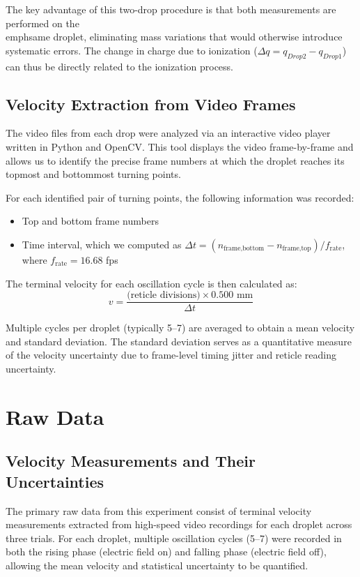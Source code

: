 \documentclass[11pt]{article}
\begin{document}
The key advantage of this two-drop procedure is that both measurements are performed on the \\emph{same droplet}, eliminating mass variations that would otherwise introduce systematic errors. The change in charge due to ionization ($\Delta q = q_{Drop 2} - q_{Drop 1}$) can thus be directly related to the ionization process.

\subsection{Velocity Extraction from Video Frames}

The video files from each drop were analyzed via an interactive video player written in Python and OpenCV. This tool displays the video frame-by-frame and allows us to identify the precise frame numbers at which the droplet reaches its topmost and bottommost turning points.

For each identified pair of turning points, the following information was recorded:
\begin{itemize}
    \item Top and bottom frame numbers
    \item Time interval, which we computed as $\Delta t = (n_{\text{frame,bottom}} - n_{\text{frame,top}}) / f_{\text{rate}}$, where $f_{\text{rate}} = 16.68$ fps
\end{itemize}

The terminal velocity for each oscillation cycle is then calculated as:
\begin{equation}
v = \frac{\text{(reticle divisions)} \times 0.500 \text{ mm}}{\Delta t}
\end{equation}

Multiple cycles per droplet (typically 5--7) are averaged to obtain a mean velocity and standard deviation. The standard deviation serves as a quantitative measure of the velocity uncertainty due to frame-level timing jitter and reticle reading uncertainty.

\section{Raw Data}

\subsection{Velocity Measurements and Their Uncertainties}

The primary raw data from this experiment consist of terminal velocity measurements extracted from high-speed video recordings for each droplet across three trials. For each droplet, multiple oscillation cycles (5--7) were recorded in both the rising phase (electric field on) and falling phase (electric field off), allowing the mean velocity and statistical uncertainty to be quantified.
\end{document}
